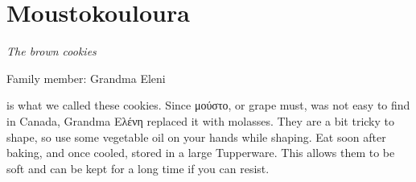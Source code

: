 \chapter{Moustokouloura}
\label{ch:moustokouloura}



\textit{The brown cookies}

Family member: Grandma Eleni

 is what we called these cookies. Since \textgreek{μούστο}, or grape must, was not easy to find in Canada, Grandma \textgreek{Ελένη} replaced it with molasses. They are a bit tricky to shape, so use some vegetable oil on your hands while shaping. Eat soon after baking, and once cooled, stored in a large Tupperware. This allows them to be soft and can be kept for a long time if you can resist.

